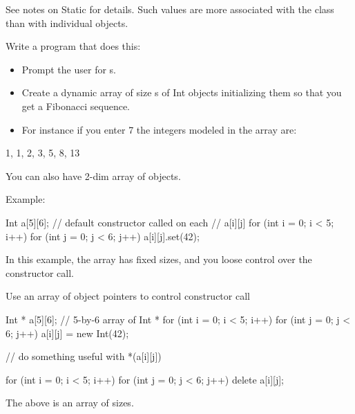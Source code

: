 See notes on Static for details. Such values are more associated with
the class than with individual objects.

\begin{ex}
Write a program that does this:

\begin{itemize}
\item
  Prompt the user for s.
\item
  Create a dynamic array of size s of Int objects initializing them so
  that you get a Fibonacci sequence.
\item
  For instance if you enter 7 the integers modeled in the array are:
\end{itemize}
\begin{center}
1, 1, 2, 3, 5, 8, 13
\end{center}
You can also have 2-dim array of objects.

Example:
\begin{console}
Int a[5][6]; // default constructor called on each
             // a[i][j]
for (int i = 0; i < 5; i++)
    for (int j = 0; j < 6; j++)
        a[i][j].set(42);
\end{console}
\end{ex}
In this example, the array has fixed sizes, and you loose control over
the constructor call.

Use an array of object pointers to control constructor call
\begin{console}
Int * a[5][6]; // 5-by-6 array of Int *
for (int i = 0; i < 5; i++)
    for (int j = 0; j < 6; j++)
        a[i][j] = new Int(42);

// do something useful with *(a[i][j])

for (int i = 0; i < 5; i++)
    for (int j = 0; j < 6; j++)
        delete a[i][j];
\end{console}
The above is an array of  sizes.


